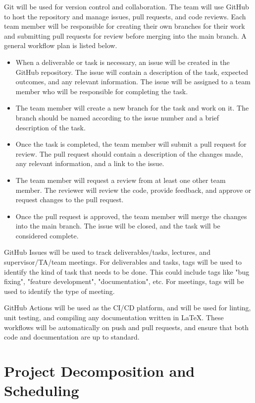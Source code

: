 \documentclass{article}
\begin{document}
Git will be used for version control and collaboration. The team will use GitHub to host the repository and manage issues, pull requests, and code reviews. Each team member will be responsible for creating their own branches for their work and submitting pull requests for review before merging into the main branch.
A general workflow plan is listed below.

\begin{itemize}
  \item When a deliverable or task is necessary, an issue will be created in the GitHub repository. The issue will contain a description of the task, expected outcomes, and any relevant information. The issue will be assigned to a team member who will be responsible for completing the task.
  \item The team member will create a new branch for the task and work on it. The branch should be named according to the issue number and a brief description of the task.
  \item Once the task is completed, the team member will submit a pull request for review. The pull request should contain a description of the changes made, any relevant information, and a link to the issue.
  \item The team member will request a review from at least one other team member. The reviewer will review the code, provide feedback, and approve or request changes to the pull request.
  \item Once the pull request is approved, the team member will merge the changes into the main branch. The issue will be closed, and the task will be considered complete.
\end{itemize}

GitHub Issues will be used to track deliverables/tasks, lectures, and supervisor/TA/team meetings. For deliverables and tasks, tags will be used to identify the kind of task that needs to be done. This could include tags like "bug fixing", "feature development", "documentation", etc. For meetings, tags will be used to identify the type of meeting.

GitHub Actions will be used as the CI/CD platform, and will be used for linting, unit testing, and compiling any documentation written in LaTeX. These workflows will be automatically on push and pull requests, and ensure that both code and documentation are up to standard.


\section{Project Decomposition and Scheduling}
\end{document}
